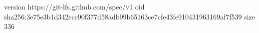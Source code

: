 version https://git-lfs.github.com/spec/v1
oid sha256:3e75e3b1d342ece90f377d58adb99b65163ce7cfe43fe910431963169af7f539
size 336
